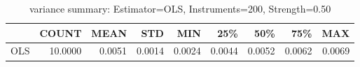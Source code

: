 \begin{table}[ht]
\centering
\caption{variance summary: Estimator=OLS, Instruments=200, Strength=0.50}
\begin{tabular}{lrrrrrrrr}
\toprule
 & COUNT & MEAN & STD & MIN & 25\% & 50\% & 75\% & MAX \\
\midrule
OLS & 10.0000 & 0.0051 & 0.0014 & 0.0024 & 0.0044 & 0.0052 & 0.0062 & 0.0069 \\
\bottomrule
\end{tabular}
\end{table}
